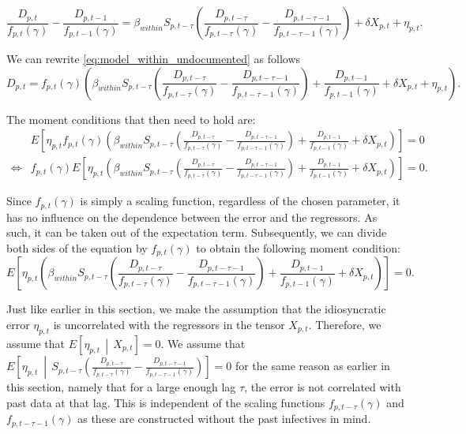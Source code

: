 \documentclass[12pt]{article}
\begin{document}
	    \begin{equation} \label{eq:model_within_undocumented}
		    \frac{D_{p,t}}{f_{p,t}(\gamma)} - \frac{D_{p,t-1}}{f_{p,t-1}(\gamma)} = \beta_{within}S_{p,t-\tau}\left(\frac{D_{p,t-\tau}}{f_{p,t-\tau}(\gamma)} - \frac{D_{p,t-\tau-1}}{f_{p,t-\tau-1}(\gamma)}\right) + \delta X_{p,t} + \eta_{p,t}.
	    \end{equation}
	    
	\noindent We can rewrite \eqref{eq:model_within_undocumented} as follows
	    \begin{equation*}
	       D_{p,t} = f_{p,t}(\gamma)\left(\beta_{within}S_{p,t-\tau}\left(\frac{D_{p,t-\tau}}{f_{p,t-\tau}(\gamma)} - \frac{D_{p,t-\tau-1}}{f_{p,t-\tau-1}(\gamma)}\right) + \frac{D_{p,t-1}}{f_{p,t-1}(\gamma)} + \delta X_{p,t} + \eta_{p,t}\right).
	    \end{equation*}
	    
	\noindent The moment conditions that then need to hold are:
	    \begin{align*}
	        & E\left[ \eta_{p,t}f_{p,t}(\gamma) \left( \beta_{within}S_{p,t-\tau}\left(\frac{D_{p,t-\tau}}{f_{p,t-\tau}(\gamma)} - \frac{D_{p,t-\tau-1}}{f_{p,t-\tau-1}(\gamma)}\right) + \frac{D_{p,t-1}}{f_{p,t-1}(\gamma)} + \delta X_{p,t} \right) \right] = 0 \\
	        \iff & f_{p,t}(\gamma) E\left[ \eta_{p,t}\left( \beta_{within}S_{p,t-\tau}\left(\frac{D_{p,t-\tau}}{f_{p,t-\tau}(\gamma)} - \frac{D_{p,t-\tau-1}}{f_{p,t-\tau-1}(\gamma)}\right) + \frac{D_{p,t-1}}{f_{p,t-1}(\gamma)} + \delta X_{p,t} \right) \right] = 0.
	    \end{align*}
	
	Since $f_{p,t}(\gamma)$ is simply a scaling function, regardless of the chosen parameter, it has no influence on the dependence between the error and the regressors. As such, it can be taken out of the expectation term. Subsequently, we can divide both sides of the equation by $f_{p,t}(\gamma)$ to obtain the following moment condition:
	    \begin{equation} \label{eq:model_within_undocumented_moments}
	        E\left[ \eta_{p,t}\left( \beta_{within}S_{p,t-\tau}\left(\frac{D_{p,t-\tau}}{f_{p,t-\tau}(\gamma)} - \frac{D_{p,t-\tau-1}}{f_{p,t-\tau-1}(\gamma)}\right) + \frac{D_{p,t-1}}{f_{p,t-1}(\gamma)} + \delta X_{p,t} \right) \right] = 0.
	    \end{equation}
	
	Just like earlier in this section, we make the assumption that the idiosyncratic error $\eta_{p,t}$ is uncorrelated with the regressors in the tensor $X_{p,t}$. Therefore, we assume that $E\left[\eta_{p,t} \,\middle|\, X_{p,t}\right] = 0$. We assume that $E\left[\eta_{p,t} ~\middle|\, S_{p,t-\tau}\left(\frac{D_{p,t-\tau}}{f_{p,t-\tau}(\gamma)} - \frac{D_{p,t-\tau-1}}{f_{p,t-\tau-1}(\gamma)}\right)\right] = 0$ for the same reason as earlier in this section, namely that for a large enough lag $\tau$, the error is not correlated with past data at that lag. This is independent of the scaling functions $f_{p,t-\tau}(\gamma)$ and $f_{p,t-\tau-1}(\gamma)$ as these are constructed without the past infectives in mind. \\
	
\end{document}
